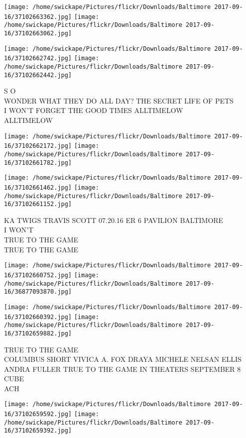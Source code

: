 \documentclass[10pt,letterpaper]{article}
\begin{document}
\texttt{[image: /home/swickape/Pictures/flickr/Downloads/Baltimore 2017-09-16/37102663362.jpg]}
\texttt{[image: /home/swickape/Pictures/flickr/Downloads/Baltimore 2017-09-16/37102663062.jpg]}

\texttt{[image: /home/swickape/Pictures/flickr/Downloads/Baltimore 2017-09-16/37102662742.jpg]}
\texttt{[image: /home/swickape/Pictures/flickr/Downloads/Baltimore 2017-09-16/37102662442.jpg]}

S O\\
WONDER WHAT THEY DO ALL DAY?  THE SECRET LIFE OF PETS\\
I WON'T FORGET THE GOOD TIMES ALLTIMELOW\\
ALLTIMELOW
\pagebreak

\texttt{[image: /home/swickape/Pictures/flickr/Downloads/Baltimore 2017-09-16/37102662172.jpg]}
\texttt{[image: /home/swickape/Pictures/flickr/Downloads/Baltimore 2017-09-16/37102661782.jpg]}

\texttt{[image: /home/swickape/Pictures/flickr/Downloads/Baltimore 2017-09-16/37102661462.jpg]}
\texttt{[image: /home/swickape/Pictures/flickr/Downloads/Baltimore 2017-09-16/37102661152.jpg]}

KA TWIGS TRAVIS SCOTT 07.20.16 ER 6 PAVILION BALTIMORE\\
I WON'T\\
TRUE TO THE GAME\\
TRUE TO THE GAME
\pagebreak

\texttt{[image: /home/swickape/Pictures/flickr/Downloads/Baltimore 2017-09-16/37102660752.jpg]}
\texttt{[image: /home/swickape/Pictures/flickr/Downloads/Baltimore 2017-09-16/36877093870.jpg]}

\texttt{[image: /home/swickape/Pictures/flickr/Downloads/Baltimore 2017-09-16/37102660392.jpg]}
\texttt{[image: /home/swickape/Pictures/flickr/Downloads/Baltimore 2017-09-16/37102659882.jpg]}

TRUE TO THE GAME\\
COLUMBUS SHORT VIVICA A. FOX DRAYA MICHELE NELSAN ELLIS ANDRA FULLER TRUE TO THE GAME IN THEATERS SEPTEMBER 8\\
CUBE\\
ACH
\pagebreak

\texttt{[image: /home/swickape/Pictures/flickr/Downloads/Baltimore 2017-09-16/37102659592.jpg]}
\texttt{[image: /home/swickape/Pictures/flickr/Downloads/Baltimore 2017-09-16/37102659392.jpg]}
\end{document}

